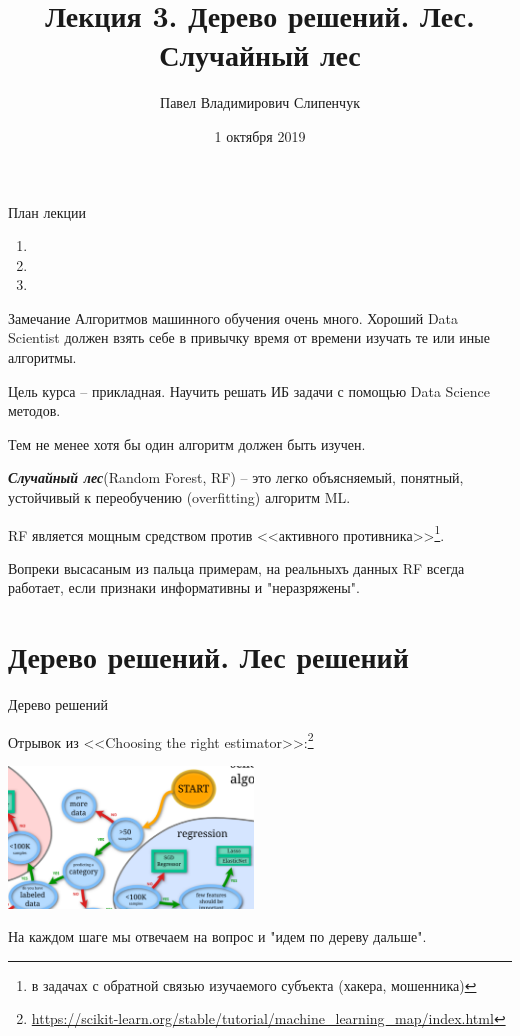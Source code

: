 \documentclass{beamer}
\title{Лекция 3. Дерево решений. Лес. Случайный лес}
\date{1 октября 2019}
\author{Павел Владимирович Слипенчук}
\institute{Москва, МГТУ им.Бауманка,\\ каф.ИУ-8, КИБ}
\newcommand{\termdef}[1]{\textbf{\textit{#1}}}
\begin{document}
  \maketitle
    
  \begin{frame}{План лекции}
    \begin{enumerate}
	 \item {}
	 \item {}
	 \item {}
	\end{enumerate}
 \end{frame}
    
  \begin{frame}
  \begin{block}{Замечание}
  	Алгоритмов машинного обучения очень много. 
  	Хороший Data Scientist должен взять себе в привычку
  	время от времени изучать те или иные алгоритмы.
  	
  	Цель курса -- прикладная. Научить решать ИБ задачи с помощью
  	Data Science методов.
  	
  	Тем не менее хотя бы один алгоритм должен быть изучен.
  \end{block}
 \end{frame}
  \begin{frame}
  \termdef{Случайный лес}(Random Forest, RF) -- это легко объясняемый, 
  понятный, 
  устойчивый к переобучению (overfitting)
  алгоритм ML.
  
  RF является мощным средством против <<активного противника>>\footnote{
  в задачах с обратной связью изучаемого субъекта (хакера, мошенника)
  }. 

  Вопреки высасаным из пальца примерам, на реальныхъ данных
  RF всегда работает, если признаки информативны и "неразряжены".
  \end{frame}

   \section{Дерево решений. Лес решений}\label{section:tree_forest}
	

  \begin{frame}{Дерево решений}
  
  Отрывок из <<Choosing the right estimator>>:\footnote{\tiny \url{https://scikit-learn.org/stable/tutorial/machine_learning_map/index.html}}
  \begin{center}
  	\includegraphics[width=6.5cm]{../pic/scikit_desicion_tree.png}\centering
  \end{center}
  На каждом шаге мы отвечаем на вопрос и "идем по дереву дальше".
  \end{frame}
\end{document}
